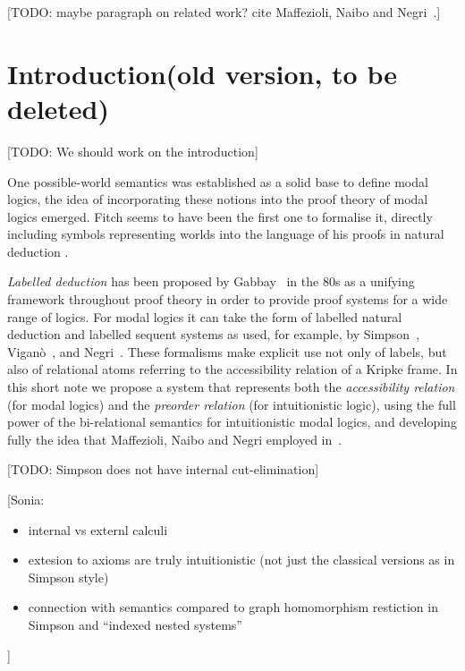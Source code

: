 \documentclass[a4paper]{article}
\theoremstyle{plain}
\theoremstyle{definition}
\newcommand{\sonia}[1]{{\color{blue}[Sonia: #1]}}
\newcommand{\todo}[1]{{\color{red}[TODO: #1]}}
\begin{document}
\todo{maybe paragraph on related work? cite Maffezioli, Naibo and Negri~\cite{maffezioli:etal:synthese13}.}


\section*{Introduction(old version, to be deleted)}
\todo{We should work on the introduction}

One possible-world semantics was established as a solid base to define modal logics, the idea of incorporating these notions into the proof theory of modal logics emerged. Fitch seems to have been the first one to formalise it, directly including symbols representing worlds into the language of his proofs in natural deduction \cite{Fitch}.

\emph{Labelled deduction} has been proposed by Gabbay~\cite{Gabbay} in the 80s as a unifying framework throughout proof theory in order to provide proof
systems for a wide range of logics. 
%
For modal logics it can take
the form of labelled natural deduction and labelled sequent systems as
used, for example, by Simpson~\cite{Simpson}, Vigan\`o~\cite{Vigano}, and
Negri~\cite{Negri}. 
%
These formalisms make explicit use not only of
labels, but also of relational atoms referring to the accessibility relation of a Kripke frame.
%
In this short note we propose a system that represents both the \emph{accessibility relation} (for modal
logics) and the \emph{preorder relation} (for intuitionistic
logic), using the full power of the bi-relational semantics for
intuitionistic modal logics,
and developing fully the idea that Maffezioli, Naibo and Negri employed in~\cite{Maffezioli}. 

\todo{Simpson does not have internal cut-elimination}

\sonia{
  \begin{itemize}
  \item internal vs externl calculi
  \item extesion to axioms are truly intuitionistic (not just the
    classical versions as in Simpson style)
  \item connection with semantics compared to graph homomorphism
    restiction in Simpson and ``indexed nested systems''
  \end{itemize}
}
  
\end{document}
